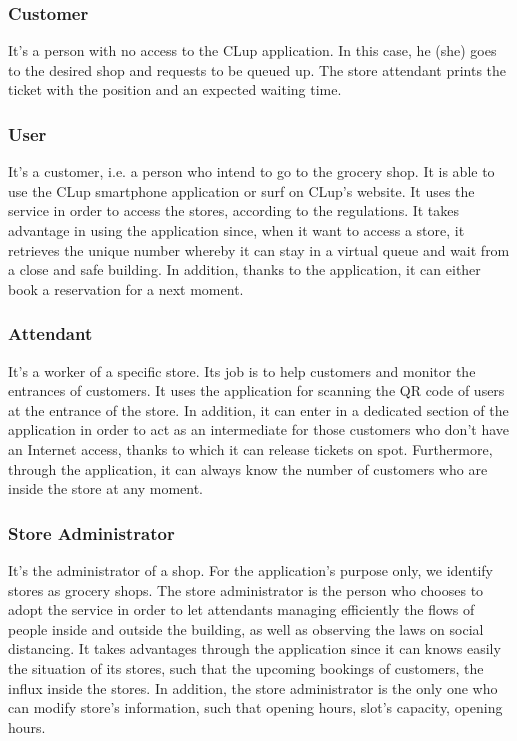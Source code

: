 \documentclass[table, 12pt]{article}
\begin{document}
\subsubsection{Customer}
It's a person with no access to the CLup application. In this case, he (she) goes to the desired shop and requests to be queued up. The store attendant prints the ticket with the position and an expected waiting time.
\subsubsection{User}
It's a customer, i.e. a person who intend to go to the grocery shop. It is able to use the CLup smartphone application or surf on CLup's website. It uses the service in order to access the stores, according to the regulations. It takes advantage in using the application since, when it want to access a store, it retrieves the unique number whereby it can stay in a virtual queue and wait from a close and safe building. In addition, thanks to the application, it can either book a reservation for a next moment.

\subsubsection{Attendant}
It's a worker of a specific store. Its job is to help customers and monitor the entrances of customers. It uses the application for scanning the QR code of users at the entrance of the store. In addition, it can enter in a dedicated section of the application in order to act as an intermediate for those customers who don't have an Internet access, thanks to which it can release tickets on spot. Furthermore, through the application, it can always know the number of customers who are inside the store at any moment.

\subsubsection{Store Administrator}
It's the administrator of a shop. For the application's purpose only, we identify stores as grocery shops. The store administrator is the person who chooses to adopt the service in order to let attendants managing efficiently the flows of people inside and outside the building, as well as observing the laws on social distancing. It takes advantages through the application since it can knows easily the situation of its stores, such that the upcoming bookings of customers, the influx inside the stores. In addition, the store administrator is the only one who can modify store's information, such that opening hours, slot's capacity, opening hours.
\end{document}
